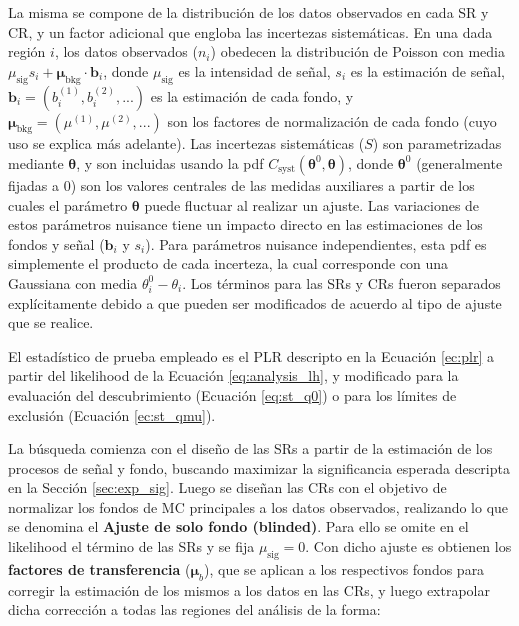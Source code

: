 La misma se compone de la distribución de los datos observados en cada SR y CR, y un factor adicional que engloba las incertezas sistemáticas. En una dada región $i$, los datos observados ($n_i$) obedecen la distribución de Poisson con media $\mu_\text{sig} s_i + \bm{\mu}_{\text{bkg}} \cdot \textbf{b}_i$, donde $\mu_\text{sig}$ es la intensidad de señal, $s_i$ es la estimación de señal, $\textbf{b}_i = (b_i^{(1)}, b_i^{(2)}, ...)$ es la estimación de cada fondo, y $\bm{\mu}_{\text{bkg}} = (\mu^{(1)}, \mu^{(2)}, ...)$ son los factores de normalización de cada fondo (cuyo uso se explica más adelante). Las incertezas sistemáticas ($S$) son parametrizadas mediante $\bm{\theta}$, y son incluidas usando la pdf $C_\text{syst} (\bm{\theta}^0, \bm{\theta})$, donde $\bm{\theta}^0$ (generalmente fijadas a 0) son los valores centrales de las medidas auxiliares a partir de los cuales el parámetro $\bm{\theta}$ puede fluctuar al realizar un ajuste. Las variaciones de estos parámetros nuisance tiene un impacto directo en las estimaciones de los fondos y señal ($\textbf{b}_i$ y $s_i$). Para parámetros nuisance independientes, esta pdf es simplemente el producto de cada incerteza, la cual corresponde con una Gaussiana con media $\theta_i^0 - \theta_i$. Los términos para las SRs y CRs fueron separados explícitamente debido a que pueden ser modificados de acuerdo al tipo de ajuste que se realice. 

El estadístico de prueba empleado es el PLR descripto en la Ecuación \ref{ec:plr} a partir del likelihood de la Ecuación \ref{eq:analysis_lh}, y modificado para la evaluación del descubrimiento (Ecuación \ref{eq:st_q0}) o para los límites de exclusión (Ecuación \ref{ec:st_qmu}).

La búsqueda comienza con el diseño de las SRs a partir de la estimación de los procesos de señal y fondo, buscando maximizar la significancia esperada descripta en la Sección \ref{sec:exp_sig}. Luego se diseñan las CRs con el objetivo de normalizar los fondos de MC principales a los datos observados, realizando lo que se denomina el \textbf{Ajuste de solo fondo (blinded)}. Para ello se omite en el likelihood el término de las SRs y se fija $\mu_\text{sig}=0$. Con dicho ajuste es obtienen los \textbf{factores de transferencia} ($\bm{\mu}_b$), que se aplican a los respectivos fondos para corregir la estimación de los mismos a los datos en las CRs, y luego extrapolar dicha corrección a todas las regiones del análisis de la forma:


